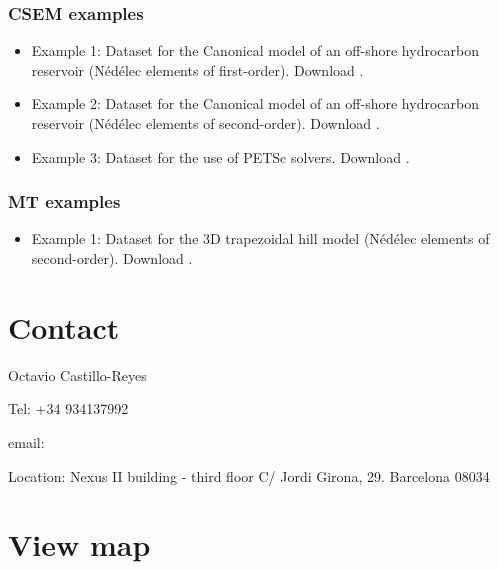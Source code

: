 \documentclass[letterpaper,10pt,english]{sphinxmanual}
\begin{document}
\subsection{CSEM examples}
\label{\detokenize{Download:csem-examples}}\begin{itemize}
\item {} 
Example 1: Dataset for the Canonical model of an off-shore hydrocarbon reservoir (Nédélec elements of first-order). Download .

\item {} 
Example 2: Dataset for the Canonical model of an off-shore hydrocarbon reservoir (Nédélec elements of second-order). Download .

\item {} 
Example 3: Dataset for the use of PETSc solvers. Download .

\end{itemize}


\subsection{MT examples}
\label{\detokenize{Download:mt-examples}}\begin{itemize}
\item {} 
Example 1: Dataset for the 3D trapezoidal hill model (Nédélec elements of second-order). Download .

\end{itemize}


\chapter{Contact}
\label{\detokenize{Contact:contact}}\label{\detokenize{Contact:id1}}\label{\detokenize{Contact::doc}}
\begin{DUlineblock}{0em}
\item[] Octavio Castillo-Reyes
\item[] Tel: +34 934137992
\item[] email: 
\item[] Location: Nexus II building - third floor C/ Jordi Girona, 29. Barcelona 08034
\end{DUlineblock}


\chapter{View map}
\label{\detokenize{Contact:view-map}}
\end{document}
